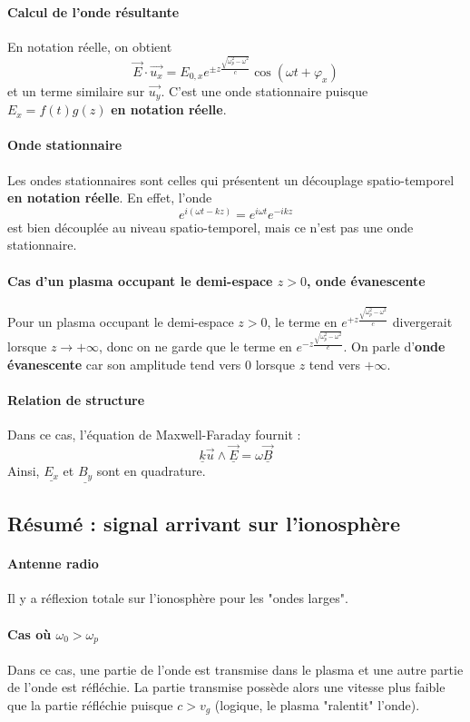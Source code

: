 \documentclass[french]{book}
\theoremstyle{plain}
\theoremstyle{definition}
\theoremstyle{remark}
\begin{document}
\paragraph{Calcul de l'onde résultante} En notation réelle, on obtient $$\overrightarrow{E}\cdot\overrightarrow{u_x}=E_{0,x}e^{\pm z\frac{\sqrt{\omega_p^2-\omega^2}}{c}}\cos(\omega t+\varphi_x)$$ et un terme similaire sur $\overrightarrow{u_y}$. C'est une onde stationnaire puisque $E_x=f(t)g(z)$ \textbf{en notation réelle}.
\paragraph{Onde stationnaire}Les ondes stationnaires sont celles qui présentent un découplage spatio-temporel \textbf{en notation réelle}. En effet, l'onde $$e^{i(\omega t-kz)}=e^{i\omega t}e^{-ikz}$$ est bien découplée au niveau spatio-temporel, mais ce n'est pas une onde stationnaire.
\paragraph{Cas d'un plasma occupant le demi-espace $z>0$, onde évanescente} Pour un plasma occupant le demi-espace $z>0$, le terme en $e^{+ z\frac{\sqrt{\omega_p^2-\omega^2}}{c}}$ divergerait lorsque $z\to+\infty$, donc on ne garde que le terme en $e^{-z\frac{\sqrt{\omega_p^2-\omega^2}}{c}}$. On parle d'\textbf{onde évanescente} car son amplitude tend vers 0 lorsque $z$ tend vers $+\infty$.
\paragraph{Relation de structure} Dans ce cas, l'équation de Maxwell-Faraday fournit : $$\underline{k}\overrightarrow{u}\wedge\underline{\overrightarrow{E}}=\omega\underline{\overrightarrow{B}}$$ Ainsi, $\underline{E_x}$ et $\underline{B_y}$ sont en quadrature.
\subsection{Résumé : signal arrivant sur l'ionosphère}
\paragraph{Antenne radio} Il y a réflexion totale sur l'ionosphère pour les "ondes larges".
\paragraph{Cas où $\omega_0 >\omega_p$} Dans ce cas, une partie de l'onde est transmise dans le plasma et une autre partie de l'onde est réfléchie. La partie transmise possède alors une vitesse plus faible que la partie réfléchie puisque $c>v_g$ (logique, le plasma "ralentit" l'onde).
\end{document}
